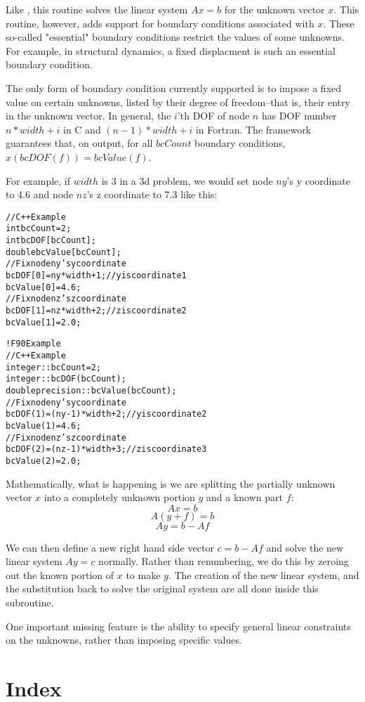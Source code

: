 \documentclass[10pt]{article}
\begin{document}
Like , this routine solves the linear system $A x = b$ for the unknown vector $x$.  This routine, however, adds support for boundary conditions associated with $x$. These so-called "essential" boundary conditions restrict the values of some unknowns. For example, in structural dynamics, a fixed displacment is such an essential boundary condition.  

The only form of boundary condition currently supported is to impose a fixed value on certain unknowns, listed by their degree of freedom--that is, their entry in the unknown vector.  In general, the $i$'th DOF of node $n$ has DOF number $n*width+i$ in C and $(n-1)*width+i$ in Fortran.  The framework guarantees that, on output, for all $bcCount$ boundary conditions, $x(bcDOF(f))=bcValue(f)$.  

For example, if $width$ is 3 in a 3d problem, we would set node $ny$'s y coordinate to 4.6 and node $nz$'s z coordinate to 7.3 like this:

\begin{alltt}
// C++ Example
  int bcCount=2;
  int bcDOF[bcCount];
  double bcValue[bcCount];
  // Fix node ny's y coordinate
  bcDOF[0]=ny*width+1; // y is coordinate 1
  bcValue[0]=4.6;
  // Fix node nz's z coordinate
  bcDOF[1]=nz*width+2; // z is coordinate 2
  bcValue[1]=2.0;

! F90 Example
// C++ Example
  integer :: bcCount=2;
  integer :: bcDOF(bcCount);
  double precision :: bcValue(bcCount);
  // Fix node ny's y coordinate
  bcDOF(1)=(ny-1)*width+2; // y is coordinate 2
  bcValue(1)=4.6;
  // Fix node nz's z coordinate
  bcDOF(2)=(nz-1)*width+3; // z is coordinate 3
  bcValue(2)=2.0;
\end{alltt}



Mathematically, what is happening is we are splitting the partially unknown vector $x$ into a completely unknown portion $y$ and a known part $f$:
\[ A x = b \]
\[ A (y + f) = b \]
\[ A y = b - A f \]

We can then define a new right hand side vector $c=b-A f$ and solve the new linear system $A y=c$ normally.  Rather than renumbering, we do this by zeroing out the known portion of $x$ to make $y$.  The creation of the new linear system, and the substitution back to solve the original system are all done inside this subroutine.

One important missing feature is the ability to specify general linear constraints on the unknowns, rather than imposing specific values.


\section{Index}

\end{document}
